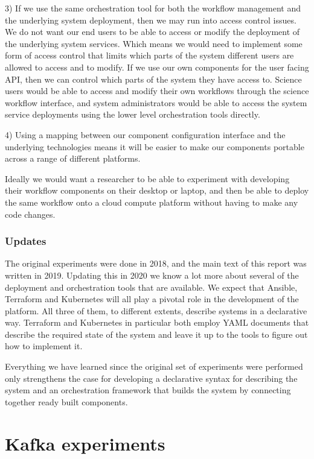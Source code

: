\documentclass{article}
\newcommand{\ansible} {Ansible\xspace}
\newcommand{\terraform} {Terraform\xspace}
\newcommand{\kubernetes} {Kubernetes\xspace}
\begin{document}
3) If we use the same orchestration tool for both the workflow management and the underlying system deployment, then we may run into access control issues.
We do not want our end users to be able to access or modify the deployment of the underlying system services. Which means we would need to implement some form of access control that limits which parts of the system different users are allowed to access and to modify.
If we use our own components for the user facing API, then we can control which parts of the system they have access to. Science users would be able to access and modify their own workflows through the science workflow interface, and system administrators would be able to access the system service deployments using the lower level orchestration tools directly.

4) Using a mapping between our component configuration interface and the underlying technologies means it will be easier to make our components portable across a range of different platforms.

Ideally we would want a researcher to be able to experiment with developing their workflow components on their desktop or laptop, and then be able to deploy the same workflow onto a cloud compute platform without having to make any code changes.

\subsubsection{Updates}
\label{workflow.updates}

The original experiments were done in 2018, and the main text of this report was written in 2019. 
Updating this in 2020 we know a lot more about several of the deployment and orchestration tools that are available.
We expect that \ansible, \terraform and \kubernetes will all play a pivotal role in the development of the platform.
All three of them, to different extents, describe systems in a declarative way.
\terraform and \kubernetes in particular both employ YAML documents that describe the required state of the system and leave it up to the tools to figure out how to implement it.

Everything we have learned since the original set of experiments were performed only strengthens the case for developing a declarative syntax for describing the system and an orchestration framework that builds the system by connecting together ready built components.

\section{Kafka experiments}
\label{kafka-compendium}
\end{document}
